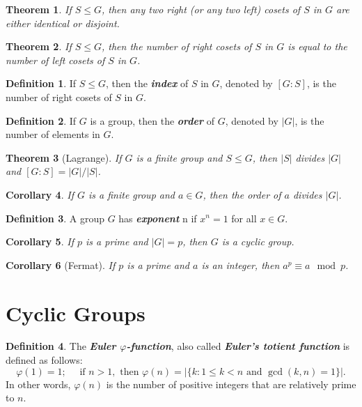 \documentclass[10pt]{report}
\newtheorem{theorem}{Theorem}[chapter]
\newtheorem{corollary}[theorem]{Corollary}
\theoremstyle{definition}
\newtheorem*{definition}{Definition}
\newcommand{\term}[1]{\textbf{\textit{#1}}}
\begin{document}
\begin{theorem}
	If $S\leq G$, then any two right (or any two left) cosets of $S$ in $G$ are either identical or disjoint.
\end{theorem}

\begin{theorem}
	If $S\leq G$, then the number of right cosets of $S$ in $G$ is equal to the number of left cosets of $S$ in $G$.
\end{theorem}

\begin{definition}
	If $S\leq G$, then the \term{index} of $S$ in $G$, denoted by $[G:S]$, is the number of right cosets of $S$ in $G$.
\end{definition}

\begin{definition}
	If $G$ is a group, then the \term{order} of $G$, denoted by $|G|$, is the number of elements in $G$.
\end{definition}

\begin{theorem}[Lagrange]
	If $G$ is a finite group and $S\leq G$, then $|S|$ divides $|G|$ and $[G:S] = |G|/|S|$.
\end{theorem}

\begin{corollary}
	If $G$ is a finite group and $a\in G$, then the order of $a$ divides $|G|$.
\end{corollary}

\begin{definition}
	A group $G$ has \term{exponent} n if $x^n=1$ for all $x\in G$.
\end{definition}

\begin{corollary}
	If $p$ is a prime and $|G|=p$, then $G$ is a cyclic group.
\end{corollary}

\begin{corollary}[Fermat]
	If $p$ is a prime and $a$ is an integer, then $a^p\equiv a\mod p$.
\end{corollary}


\section{Cyclic Groups}

\begin{definition}
	The \term{Euler $\varphi$-function}, also called \term{Euler's totient function} is defined as follows:
	\[ \varphi(1)=1;\quad\text{ if }n>1,\text{ then }\varphi(n)=|\{k:1\leq k<n\text{ and }\gcd(k, n)=1\}|. \]
	In other words, $\varphi(n)$ is the number of positive integers that are relatively prime to $n$.
\end{definition}
\end{document}
